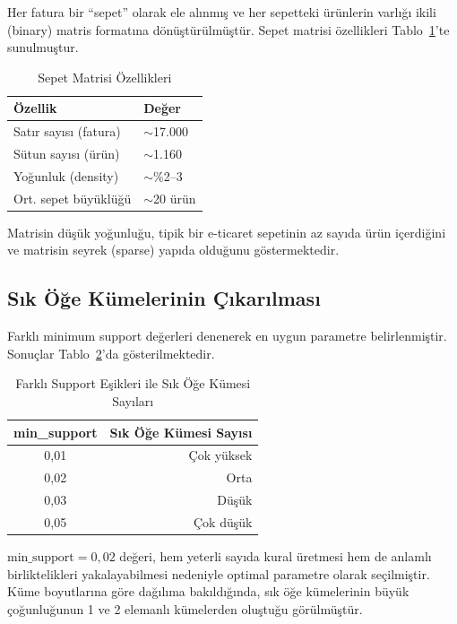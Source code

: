 \documentclass[conference]{IEEEtran}
\begin{document}
Her fatura bir ``sepet'' olarak ele alınmış ve her sepetteki ürünlerin varlığı ikili (binary) matris formatına dönüştürülmüştür. Sepet matrisi özellikleri Tablo~\ref{tab:basket}'te sunulmuştur.

\begin{table}[h]
\centering
\caption{Sepet Matrisi Özellikleri}
\label{tab:basket}
\begin{tabular}{ll}
\toprule
\textbf{Özellik} & \textbf{Değer} \\
\midrule
Satır sayısı (fatura) & $\sim$17.000 \\
Sütun sayısı (ürün) & $\sim$1.160 \\
Yoğunluk (density) & $\sim$\%2--3 \\
Ort. sepet büyüklüğü & $\sim$20 ürün \\
\bottomrule
\end{tabular}
\end{table}

Matrisin düşük yoğunluğu, tipik bir e-ticaret sepetinin az sayıda ürün içerdiğini ve matrisin seyrek (sparse) yapıda olduğunu göstermektedir.

\subsection{Sık Öğe Kümelerinin Çıkarılması}

Farklı minimum support değerleri denenerek en uygun parametre belirlenmiştir. Sonuçlar Tablo~\ref{tab:support}'da gösterilmektedir.

\begin{table}[h]
\centering
\caption{Farklı Support Eşikleri ile Sık Öğe Kümesi Sayıları}
\label{tab:support}
\begin{tabular}{cr}
\toprule
\textbf{min\_support} & \textbf{Sık Öğe Kümesi Sayısı} \\
\midrule
0,01 & Çok yüksek \\
0,02 & Orta \\
0,03 & Düşük \\
0,05 & Çok düşük \\
\bottomrule
\end{tabular}
\end{table}

$\text{min\_support} = 0,02$ değeri, hem yeterli sayıda kural üretmesi hem de anlamlı birliktelikleri yakalayabilmesi nedeniyle optimal parametre olarak seçilmiştir. Küme boyutlarına göre dağılıma bakıldığında, sık öğe kümelerinin büyük çoğunluğunun 1 ve 2 elemanlı kümelerden oluştuğu görülmüştür.
\end{document}
